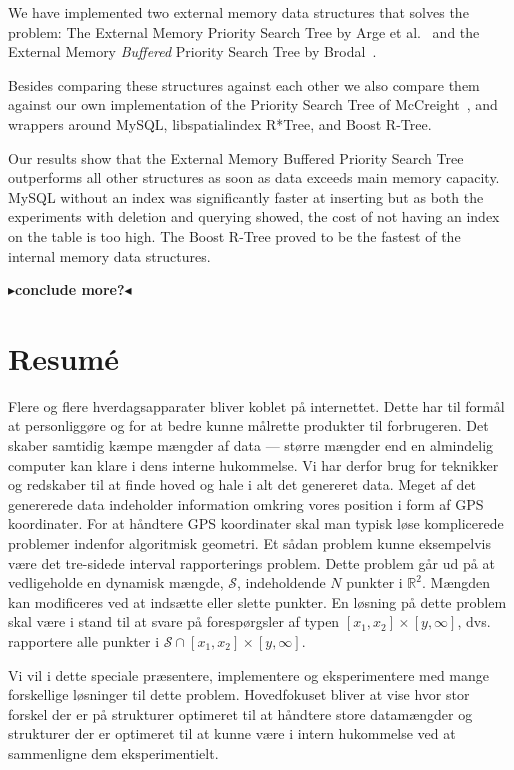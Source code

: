 \documentclass[twoside,11pt,openright]{report}
\newcommand{\todo}[1]{{\color[rgb]{.5,0,0}\textbf{$\blacktriangleright$#1$\blacktriangleleft$}}}
\begin{document}
We have implemented two external memory data structures that solves the problem: The External Memory Priority Search Tree by Arge et al.~\cite{arge_samoladas_vitter_1999} and the External Memory \textit{Buffered} Priority Search Tree by Brodal~\cite{DBLP:journals/corr/Brodal15}.

Besides comparing these structures against each other we also compare them against our own implementation of the Priority Search Tree of McCreight~\cite{DBLP:journals/siamcomp/McCreight85}, and wrappers around MySQL, libspatialindex R*Tree, and Boost R-Tree.

Our results show that the External Memory Buffered Priority Search Tree outperforms all other structures as soon as data exceeds main memory capacity. MySQL without an index was significantly faster at inserting but as both the experiments with deletion and querying showed, the cost of not having an index on the table is too high. The Boost R-Tree proved to be the fastest of the internal memory data structures.

\todo{conclude more?}

\chapter*{Resum\'e}

Flere og flere hverdagsapparater bliver koblet p{\aa} internettet. Dette har til form{\aa}l at personligg{\o}re og for at bedre kunne m{\aa}lrette produkter til forbrugeren. Det skaber samtidig k{\ae}mpe m{\ae}ngder af data --- st{\o}rre m{\ae}ngder end en almindelig computer kan klare i dens interne hukommelse. Vi har derfor brug for teknikker og redskaber til at finde hoved og hale i alt det genereret data. Meget af det genererede data indeholder information omkring vores position i form af GPS koordinater. For at h{\aa}ndtere GPS koordinater skal man typisk l{\o}se komplicerede problemer indenfor algoritmisk geometri. Et s{\aa}dan problem kunne eksempelvis v{\ae}re det tre-sidede interval rapporterings problem. Dette problem g{\aa}r ud p{\aa} at vedligeholde en dynamisk m{\ae}ngde, $\mathcal{S}$, indeholdende $N$ punkter i $\mathbb{R}^2$. M{\ae}ngden kan modificeres ved at inds{\ae}tte eller slette punkter. En l{\o}sning p{\aa} dette problem skal v{\ae}re i stand til at svare p{\aa} foresp{\o}rgsler af typen $[x_1,x_2] \times [y,\infty]$, dvs. rapportere alle punkter i $\mathcal{S} \cap [x_1,x_2] \times [y,\infty]$.

Vi vil i dette speciale pr{\ae}sentere, implementere og eksperimentere med mange forskellige l{\o}sninger til dette problem. Hovedfokuset bliver at vise hvor stor forskel der er p{\aa} strukturer optimeret til at h{\aa}ndtere store data\-m{\ae}ngder og strukturer der er optimeret til at kunne v{\ae}re i intern hukommelse ved at sammenligne dem eksperimentielt.
\end{document}

